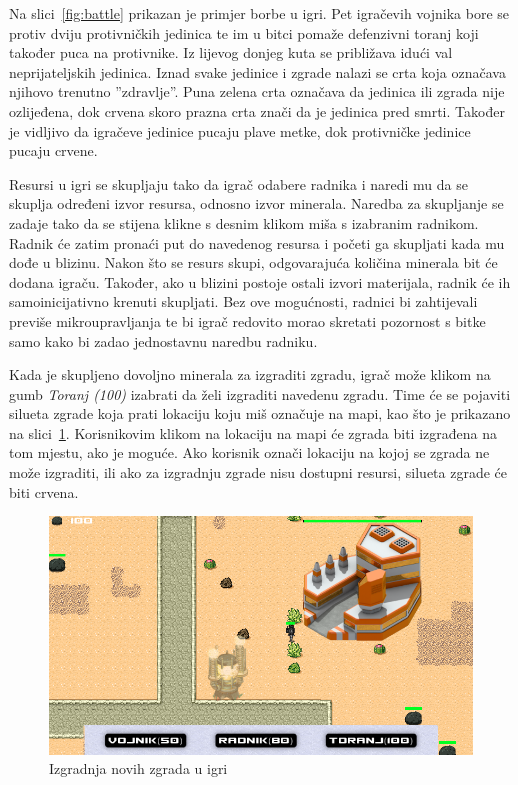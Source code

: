 \documentclass[times, utf8, zavrsni, numeric]{fer}
\begin{document}
\par Na slici~\ref{fig:battle} prikazan je primjer borbe u igri.
Pet igračevih vojnika bore se protiv dviju protivničkih jedinica te im u bitci pomaže defenzivni toranj koji također puca na protivnike.
Iz lijevog donjeg kuta se približava idući val neprijateljskih jedinica.
Iznad svake jedinice i zgrade nalazi se crta koja označava njihovo trenutno ''zdravlje''.
Puna zelena crta označava da jedinica ili zgrada nije ozlijeđena, dok crvena skoro prazna crta znači da je jedinica pred smrti.
Također je vidljivo da igračeve jedinice pucaju plave metke, dok protivničke jedinice pucaju crvene.

\par Resursi u igri se skupljaju tako da igrač odabere radnika i naredi mu da se skuplja određeni izvor resursa, odnosno izvor minerala.
Naredba za skupljanje se zadaje tako da se stijena klikne s desnim klikom miša s izabranim radnikom.
Radnik će zatim pronaći put do navedenog resursa i početi ga skupljati kada mu dođe u blizinu.
Nakon što se resurs skupi, odgovarajuća količina minerala bit će dodana igraču.
Također, ako u blizini postoje ostali izvori materijala, radnik će ih samoinicijativno krenuti skupljati.
Bez ove mogućnosti, radnici bi zahtijevali previše mikroupravljanja te bi igrač redovito morao skretati pozornost s bitke samo kako bi zadao jednostavnu naredbu radniku.

\par Kada je skupljeno dovoljno minerala za izgraditi zgradu, igrač može klikom na gumb \textit{Toranj (100)} izabrati da želi izgraditi navedenu zgradu.
Time će se pojaviti silueta zgrade koja prati lokaciju koju miš označuje na mapi, kao što je prikazano na slici~\ref{fig:building}.
Korisnikovim klikom na lokaciju na mapi će zgrada biti izgrađena na tom mjestu, ako je moguće.
Ako korisnik označi lokaciju na kojoj se zgrada ne može izgraditi, ili ako za izgradnju zgrade nisu dostupni resursi, silueta zgrade će biti crvena.

\begin{figure}[h]
	\centering
	\includegraphics[width=0.9\linewidth]{images/building.png}
	\caption{Izgradnja novih zgrada u igri}
	\label{fig:building}
\end{figure}
\end{document}
